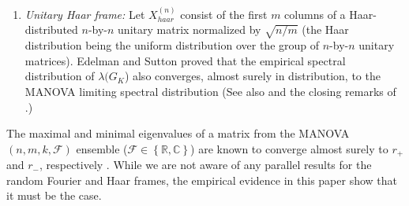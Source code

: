 \documentclass[a4paper,12pt]{article}
\newcommand{\TODO}[1]{ {\tt \color{red} [TODO:#1] } }
\newcommand{\R}{\ensuremath{\mathbb{R}}}
\newcommand{\C}{\ensuremath{\mathbb{C}}}
\newcommand{\Fc}{\ensuremath{\mathcal{F}}}
\newcommand{\m}{m}
\newcommand{\Gk}{\ensuremath{G_K}}
\begin{document}
\begin{enumerate}
Note that the support of the MANOVA$(\beta,\gamma)$ distribution is smaller than
that of the corresponding Mar\u cenko-Pastur law for the same aspect ratios. Figure
\ref{fig:MANOVA_MP} shows these two densities for $\beta=0.8$ 
and $\gamma=0.5$.
Nevertheless, as the MANOVA dimension ratio becomes small,
its distribution tends to the Mar\u cenko-Pastur distribution \eqref{MPdensity:eq},
i.e., $f^{MANOVA}_{\beta,\gamma}(x) \rightarrow f^{MP}_\beta(x)$ as $\gamma \rightarrow 0$.
Thus, a highly redundant random Fourier frame behaves like
a Gaussian i.i.d. frame.
\begin{figure}[h]
\centering
\texttt{[image: SpectrumExample\_gamma0\_5\_bata1\_25\_pnas.eps]}
\caption{Limiting 
	MANOVA ($\beta=0.8,\gamma=0.5$) 
and Mar\u cenko-Pastur ($\beta=0.8$) density
functions. Left: density on the interval $x\in [0,4]$. Right: Zoom in on the
interval $x\in[0,0.1]$. 
}
\label{fig:MANOVA_MP}
\end{figure}

\item {\em Unitary Haar frame:}
Let $X_{haar}^{(n)}$ consist of
the first $\m$ columns of a
Haar-distributed $n$-by-$n$ unitary matrix normalized by $\sqrt{n/\m}$ (the Haar distribution being the
uniform distribution over the group of $n$-by-$n$ unitary matrices).
Edelman and Sutton \cite{Edelman} proved that 
the empirical spectral distribution of $\lambda(\Gk$) also converges, almost
surely in distribution, to the
MANOVA limiting spectral distribution 
(See also \cite{wachter} and the closing remarks of \cite{Farrell}.)
%
\end{enumerate}
The maximal and minimal eigenvalues of a matrix
from the MANOVA$(n,\m,k,\Fc)$ ensemble ($\Fc\in\left\{ \R,\C \right\}$) 
are known to converge almost surely 
to $r_+$ and $r_-$, respectively \cite{Johnstone2008}.
While we are not aware of any parallel results for the random Fourier and Haar
frames,  
the empirical evidence in this paper show that it must be the case.
\end{document}
